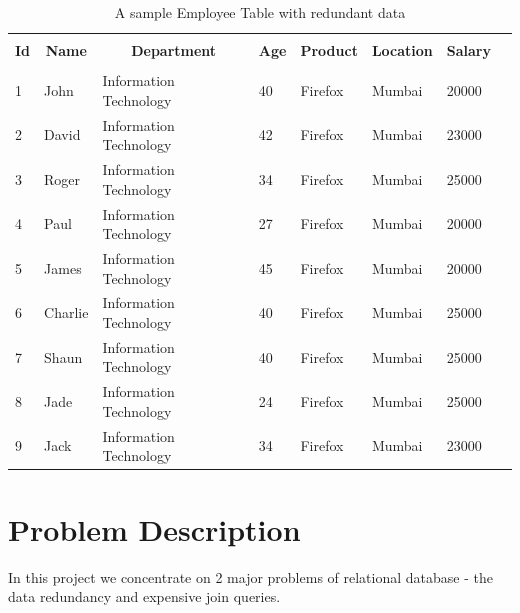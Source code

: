 \documentclass[12pt, oneside]{book}
\begin{document}
\begin{table}[h]
\begin{center}
    \begin{tabular}{| m{} | m{} | m{} | m{} | m{} | m{} | m{} | @{}m{0pt}@{}}
    \hline
    \multicolumn{1}{|c|}{} & \multicolumn{1}{c|}{} & \multicolumn{1}{c|}{} & \multicolumn{1}{c|}{} & \multicolumn{1}{c|}{} & \multicolumn{1}{c|}{} & \multicolumn{1}{c|}{} &  \\
    \multicolumn{1}{|c|}{\textbf{Id}} & \multicolumn{1}{c|}{\textbf{Name}} & \multicolumn{1}{c|}{\textbf{Department}} & \multicolumn{1}{c|}{\textbf{Age}} & \multicolumn{1}{c|}{\textbf{Product}} & \multicolumn{1}{c|}{\textbf{Location}} & \multicolumn{1}{c|}{\textbf{Salary}} & \\
    \multicolumn{1}{|c|}{} & \multicolumn{1}{c|}{} & \multicolumn{1}{c|}{} & \multicolumn{1}{c|}{} & \multicolumn{1}{c|}{} & \multicolumn{1}{c|}{} & \multicolumn{1}{c|}{} &  \\
    \hline
    1 & John & Information Technology & 40 & Firefox & Mumbai & 20000 & \\ [1ex] \hline
    2 & David & Information Technology & 42 & Firefox & Mumbai & 23000 & \\ [1ex] \hline
    3 & Roger & Information Technology & 34 & Firefox & Mumbai & 25000 & \\ [1ex] \hline
    4 & Paul & Information Technology & 27 & Firefox & Mumbai & 20000 & \\ [1ex] \hline
    5 & James & Information Technology & 45 & Firefox & Mumbai & 20000 & \\ [1ex] \hline
    6 & Charlie & Information Technology & 40 & Firefox & Mumbai & 25000 & \\ [1ex] \hline
    7 & Shaun & Information Technology & 40 & Firefox & Mumbai & 25000 & \\ [1ex] \hline
    8 & Jade & Information Technology & 24 & Firefox & Mumbai & 25000 & \\ [1ex] \hline
    9 & Jack & Information Technology & 34 & Firefox & Mumbai & 23000 & \\ [1ex] \hline
    \end{tabular}
\end{center}
    \caption{A sample Employee Table with redundant data}
    \label{tab:employee_demo}
\end{table}
\section{Problem Description}
In this project we concentrate on 2 major problems of relational database - the data redundancy and expensive join queries.
\end{document}
